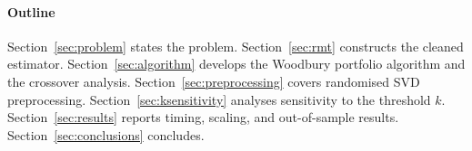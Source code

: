 \paragraph{Outline}
Section~\ref{sec:problem} states the problem. Section~\ref{sec:rmt} constructs
the cleaned estimator. Section~\ref{sec:algorithm} develops the Woodbury portfolio
algorithm and the crossover analysis. Section~\ref{sec:preprocessing} covers
randomised SVD preprocessing. Section~\ref{sec:ksensitivity} analyses sensitivity
to the threshold $k$. Section~\ref{sec:results} reports timing, scaling, and
out-of-sample results. Section~\ref{sec:conclusions} concludes.
